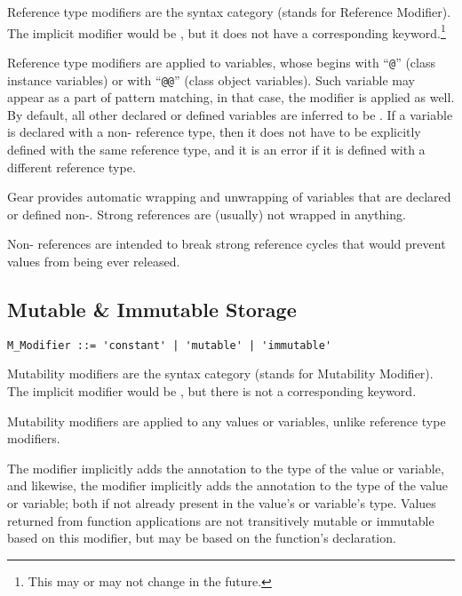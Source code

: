 Reference type modifiers are the syntax category  (stands for Reference Modifier). The implicit modifier would be , but it does not have a corresponding keyword.\footnote{This may or may not change in the future.} 

Reference type modifiers are applied to variables, whose  begins with ``\lstinline!@!'' (class instance variables) or with ``\lstinline!@@!'' (class object variables). Such variable may appear as a part of pattern matching, in that case, the modifier is applied as well. By default, all other declared or defined variables are inferred to be . If a variable is declared with a non- reference type, then it does not have to be explicitly defined with the same reference type, and it is an error if it is defined with a different reference type. 

Gear provides automatic wrapping and unwrapping of variables that are declared or defined non-. Strong references are (usually) not wrapped in anything. 

Non- references are intended to break strong reference cycles that would prevent values from being ever released. 





\subsection{Mutable \& Immutable Storage}
\label{sec:mutable-immutable-storage}

\syntax\begin{lstlisting}
M_Modifier ::= 'constant' | 'mutable' | 'immutable'
\end{lstlisting}

Mutability modifiers are the syntax category  (stands for Mutability Modifier). The implicit modifier would be , but there is not a corresponding keyword. 

Mutability modifiers are applied to any values or variables, unlike reference type modifiers. 

The  modifier implicitly adds the  annotation to the type of the value or variable, and likewise, the  modifier implicitly adds the  annotation to the type of the value or variable; both if not already present in the value's or variable's type. Values returned from function applications are not transitively mutable or immutable based on this modifier, but may be based on the function's declaration. 


